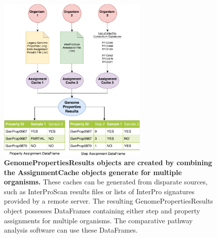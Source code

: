 \begin{figure}[!ht]
  \centering
	\includegraphics[width=0.65\textwidth]{media/assignment_results_overview.pdf}
	 \caption[GenomePropertiesResults objects are created by combining the AssignmentCache objects generate for multiple organisms.]{\textbf{GenomePropertiesResults objects are created by combining the AssignmentCache objects generate for multiple organisms.} These caches can be generated from disparate sources, such as InterProScan results files or lists of InterPro signatures provided by a remote server. The resulting GenomePropertiesResults object possesses DataFrames containing either step and property assignments for multiple organisms. The comparative pathway analysis software can use these DataFrames.}
	 \label{fig:resultscreation}
\end{figure}

